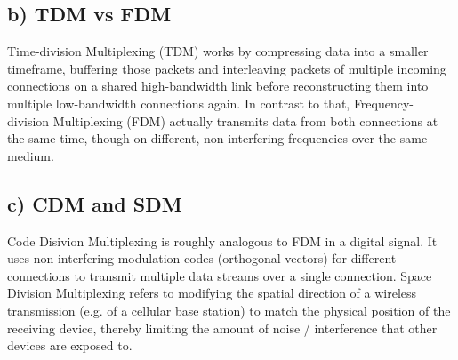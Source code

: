 \documentclass[a4paper, 11 pt, article, accentcolor=tud7b]{tudreport}
\begin{document}
	\subsection*{b) TDM vs FDM}
	Time-division Multiplexing (TDM) works by compressing data into a smaller timeframe, buffering those packets and interleaving packets of multiple incoming connections on a shared high-bandwidth link before reconstructing them into multiple low-bandwidth connections again. In contrast to that, Frequency-division Multiplexing (FDM) actually transmits data from both connections at the same time, though on different, non-interfering frequencies over the same medium.
	\subsection*{c) CDM and SDM}
	Code Disivion Multiplexing is roughly analogous to FDM in a digital signal. It uses non-interfering modulation codes (orthogonal vectors) for different connections to transmit multiple data streams over a single connection.
  Space Division Multiplexing refers to modifying the spatial direction of a wireless transmission (e.g. of a cellular base station) to match the physical position of the receiving device, thereby limiting the amount of noise / interference that other devices are exposed to.
\end{document}
